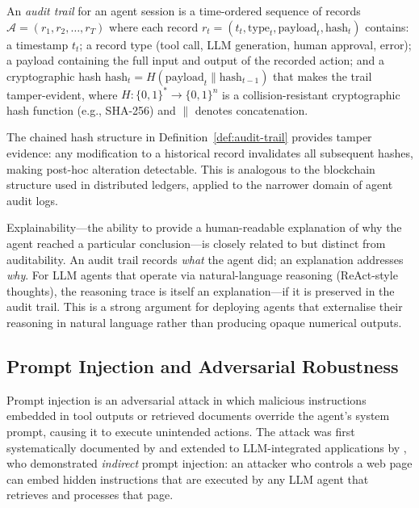 \begin{context}
\begin{definition}
\label{def:audit-trail}
An \emph{audit trail} for an agent session is a time-ordered sequence of records
$\mathcal{A} = (r_1, r_2, \ldots, r_T)$ where each record $r_t = (t_t, \text{type}_t,
\text{payload}_t, \text{hash}_t)$ contains: a timestamp $t_t$; a record type (tool
call, LLM generation, human approval, error); a payload containing the full input
and output of the recorded action; and a cryptographic hash $\text{hash}_t =
H(\text{payload}_t \| \text{hash}_{t-1})$ that makes the trail tamper-evident,
where $H:\{0,1\}^* \to \{0,1\}^n$ is a collision-resistant cryptographic hash function (e.g., SHA-256) and $\|$ denotes concatenation.
\end{definition}

The chained hash structure in Definition~\ref{def:audit-trail} provides tamper
evidence: any modification to a historical record invalidates all subsequent hashes,
making post-hoc alteration detectable. This is analogous to the blockchain structure
used in distributed ledgers, applied to the narrower domain of agent audit logs.

Explainability---the ability to provide a human-readable explanation of why the agent
reached a particular conclusion---is closely related to but distinct from auditability.
An audit trail records \emph{what} the agent did; an explanation addresses \emph{why}.
For LLM agents that operate via natural-language reasoning (ReAct-style thoughts), the
reasoning trace is itself an explanation---if it is preserved in the audit trail. This
is a strong argument for deploying agents that externalise their reasoning in natural
language rather than producing opaque numerical outputs.


\subsection{Prompt Injection and Adversarial Robustness}
\label{subsec:adversarial}

Prompt injection is an adversarial attack in which malicious instructions embedded in
tool outputs or retrieved documents override the agent's system prompt, causing it to
execute unintended actions. The attack was first systematically documented by
\citet{perez2022ignore} and extended to LLM-integrated applications by
\citet{greshake2023not}, who demonstrated \emph{indirect} prompt injection: an attacker
who controls a web page can embed hidden instructions that are executed by any LLM
agent that retrieves and processes that page.


\end{context}
